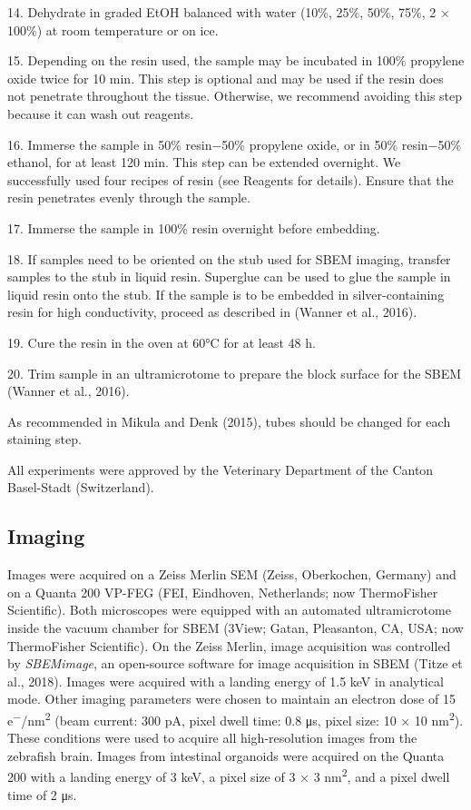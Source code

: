 \documentclass{article}
\newenvironment{steplist}{\par\setlength{\parindent}{0pt}\everypar{\hangindent=1.6em\hangafter=1\relax}}{\par\smallskip}
\begin{document}
\begin{steplist}
14. Dehydrate in graded EtOH balanced with water (10\%, 25\%, 50\%, 75\%, 2 × 100\%) at room temperature or on ice.

15. Depending on the resin used, the sample may be incubated in 100\% propylene oxide twice for 10 min. This step is optional and may be used if the resin does not penetrate throughout the tissue. Otherwise, we recommend avoiding this step because it can wash out reagents.

16. Immerse the sample in 50\% resin−50\% propylene oxide, or in 50\% resin−50\% ethanol, for at least 120 min. This step can be extended overnight. We successfully used four recipes of resin (see Reagents for details). Ensure that the resin penetrates evenly through the sample.

17. Immerse the sample in 100\% resin overnight before embedding.

18. If samples need to be oriented on the stub used for SBEM imaging, transfer samples to the stub in liquid resin. Superglue can be used to glue the sample in liquid resin onto the stub. If the sample is to be embedded in silver-containing resin for high conductivity, proceed as described in (Wanner et al., 2016).

19. Cure the resin in the oven at 60°C for at least 48 h.

20. Trim sample in an ultramicrotome to prepare the block surface for the SBEM (Wanner et al., 2016).
\end{steplist}

As recommended in Mikula and Denk (2015), tubes should be changed for each staining step.

All experiments were approved by the Veterinary Department of the Canton Basel-Stadt (Switzerland).

\subsection*{Imaging}

Images were acquired on a Zeiss Merlin SEM (Zeiss, Oberkochen, Germany) and on a Quanta 200 VP-FEG (FEI, Eindhoven, Netherlands; now ThermoFisher Scientific). Both microscopes were equipped with an automated ultramicrotome inside the vacuum chamber for SBEM (3View; Gatan, Pleasanton, CA, USA; now ThermoFisher Scientific). On the Zeiss Merlin, image acquisition was controlled by \emph{SBEMimage}, an open-source software for image acquisition in SBEM (Titze et al., 2018). Images were acquired with a landing energy of 1.5 keV in analytical mode. Other imaging parameters were chosen to maintain an electron dose of 15 e\textsuperscript{−}/nm\textsuperscript{2} (beam current: 300 pA, pixel dwell time: 0.8 μs, pixel size: 10 × 10 nm\textsuperscript{2}). These conditions were used to acquire all high-resolution images from the zebrafish brain. Images from intestinal organoids were acquired on the Quanta 200 with a landing energy of 3 keV, a pixel size of 3 × 3 nm\textsuperscript{2}, and a pixel dwell time of 2 μs.
\end{document}
